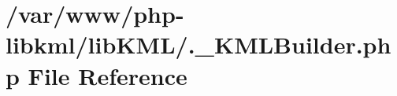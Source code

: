\hypertarget{_8__KMLBuilder_8php}{
\section{/var/www/php-\/libkml/libKML/.\_\-KMLBuilder.php File Reference}
\label{de/dce/_8__KMLBuilder_8php}
}
